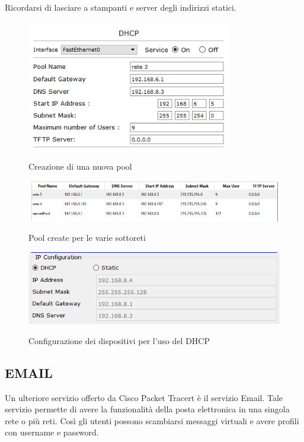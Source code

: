 \noindent Ricordarsi di lasciare a stampanti e server degli indirizzi statici.


\begin{figure}[htbp]
    \centering
    \includegraphics[width=0.8\textwidth]{images/06.servizi-rete/dhcp/01.conf-pool.png}
    \label{fig:dhcp-conf-pool}
    \caption{Creazione di una nuova pool}
\end{figure}

\begin{figure}[htbp]
    \centering
    \includegraphics[width=\textwidth]{images/06.servizi-rete/dhcp/02.pools.png}
    \label{fig:dhcp-pools}
    \caption{Pool create per le varie sottoreti}
\end{figure}

\begin{figure}[htbp]
    \centering
    \includegraphics[width=\textwidth]{images/06.servizi-rete/dhcp/03.conf-pc.png}
    \label{fig:dhcp-conf-pc}
    \caption{Configurazione dei dispositivi per l'uso del DHCP}
\end{figure}

\subsection{EMAIL}
Un ulteriore servizio offerto da Cisco Packet Tracert è il servizio Email. Tale servizio permette di avere la funzionalità della posta elettronica in una singola rete o più reti. Così gli utenti possono scambiarsi messaggi virtuali e avere profili con username e password.

